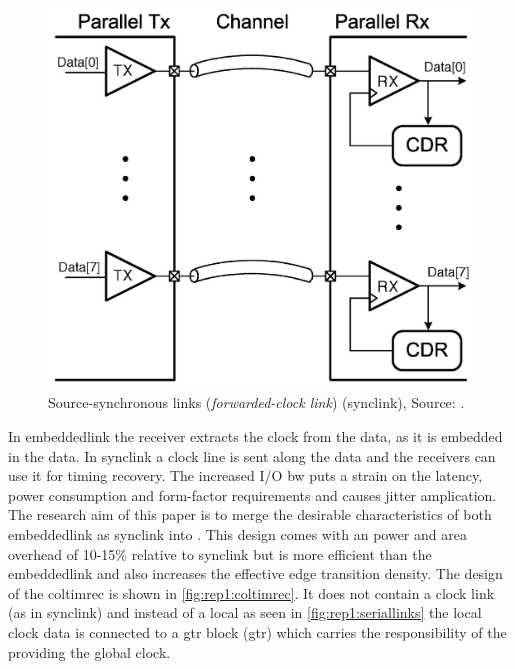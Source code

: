 \begin{figure}	
    \centering
	\includegraphics[width=0.8\linewidth]{Figures/Rep1EnsembleSerLinks.png}
	\caption{Source-synchronous links (\textit{forwarded-clock link}) (\ac{synclink}), Source: \cite{agrawal20098}.} 
    \label{fig:rep1:synclinks}
\end{figure}

In \ac{embeddedlink} the receiver extracts the clock from the data, as it is embedded in the data. 
In \ac{synclink} a clock line is sent along the data and the receivers can use it for timing recovery. 
\objective
The increased I/O \ac{bw} puts a strain on the latency, power consumption and form-factor requirements and causes jitter amplication. 
\motive
The research aim of this paper is to merge the desirable characteristics of both \ac{embeddedlink} as \ac{synclink} into .
This design comes with an power and area overhead of 10-15\% relative to \ac{synclink} but is more efficient than the \ac{embeddedlink} and also increases the effective edge transition density.
\summary
The design of the \ac{coltimrec} is shown in \cref{fig:rep1:coltimrec}. 
It does not contain a clock link (as in \ac{synclink}) and instead of a local  as seen in \cref{fig:rep1:seriallinks} the local clock data is connected to a \acl{gtr} block (\ac{gtr}) which carries the responsibility of the providing the global clock.

